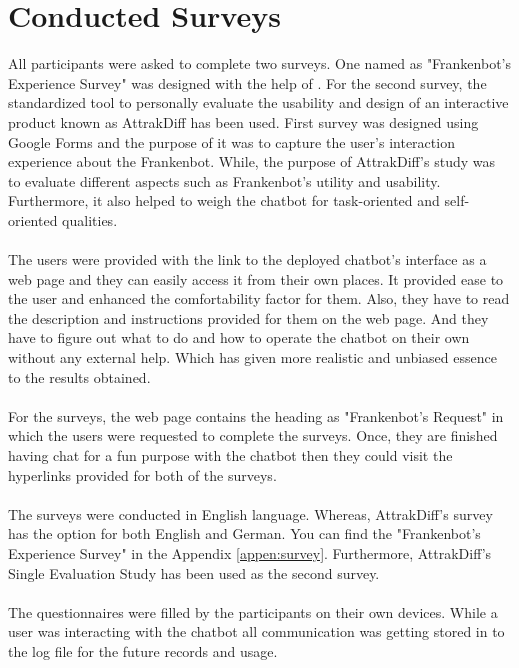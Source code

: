 \section{Conducted Surveys}
All participants were asked to complete two surveys. One named as "Frankenbot's Experience Survey" was designed with the help of \cite{evaluatingSpokDialSys}\cite{itut}. For the second survey, the standardized tool to personally evaluate the usability and design of an interactive product known as AttrakDiff \cite{attrakdiff} has been used. First survey was designed using Google Forms and the purpose of it was to capture the user's interaction experience about the Frankenbot. While, the purpose of AttrakDiff's study was to evaluate different aspects such as Frankenbot's utility and usability. Furthermore, it also helped to weigh the chatbot for task-oriented and self-oriented qualities. 
\\~\\
The users were provided with the link to the deployed chatbot's interface as a web page and they can easily access it from their own places. It provided ease to the user and enhanced the comfortability factor for them. Also, they have to read the description and instructions provided for them on the web page. And they have to figure out what to do and how to operate the chatbot on their own without any external help. Which has given more realistic and unbiased essence to the results obtained.
\\~\\
For the surveys, the web page contains the heading as "Frankenbot's Request" in which the users were requested to complete the surveys. Once, they are finished having chat for a fun purpose with the chatbot then they could visit the hyperlinks provided for both of the surveys.
\\~\\
The surveys were conducted in English language. Whereas, AttrakDiff's survey has the option for both English and German. You can find the "Frankenbot's Experience Survey" in the Appendix \ref{appen:survey}. Furthermore, AttrakDiff's Single Evaluation Study\cite{indeval} has been used as the second survey.
\\~\\
The questionnaires were filled by the participants on their own devices. While a user was interacting with the chatbot all communication was getting stored in to the log file for the future records and usage.

